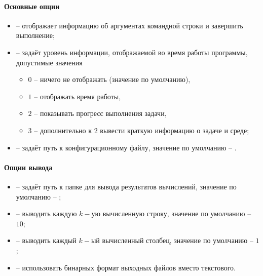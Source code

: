 \documentclass[../document.tex]{subfiles}
\begin{document}
                \paragraph{Основные опции}
                    \begin{itemize}
                        \item{} -- отображает информацию об аргументах командной строки и завершить выполнение;
                        \item{} -- задаёт уровень информации, отображаемой во время работы программы, допустимые значения
                            \begin{itemize}
                                \item $0$ -- ничего не отображать (значение по умолчанию),
                                \item $1$ -- отображать время работы,
                                \item $2$ -- показывать прогресс выполнения задачи,
                                \item $3$ -- дополнительно к $2$ вывести краткую информацию о задаче и среде;
                            \end{itemize}
                        \item{} -- задаёт путь к конфигурационному файлу, значение по умолчанию -- .
                    \end{itemize}
                \paragraph{Опции вывода}
                    \begin{itemize}
                        \item{} -- задаёт путь к папке для вывода результатов вычислений, значение по умолчанию -- ;
                        \item{} -- выводить каждую $k-\text{ую}$ вычисленную строку, значение по умолчанию -- $10$;
                        \item{} -- выводить каждый $k-\text{ый}$ вычисленный столбец, значение по умолчанию -- $1$;
                        \item{} -- использовать бинарных формат выходных файлов вместо текстового.
                    \end{itemize}
\end{document}
